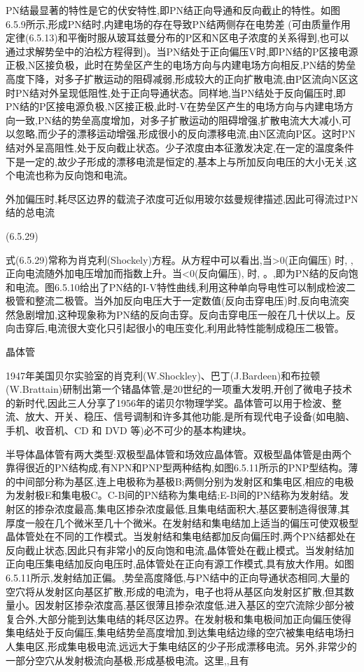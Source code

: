 PN结最显著的特性是它的伏安特性,即PN结正向导通和反向截止的特性。如图6.5.9所示,形成PN结时,内建电场的存在导致PN结两侧存在电势差 (可由质量作用定律(6.5.13)和平衡时服从玻耳兹曼分布的P区和N区电子浓度的关系得到,也可以通过求解势垒中的泊松方程得到)。当PN结处于正向偏压V时,即PN结的P区接电源正极,N区接负极，此时在势垒区产生的电场方向与内建电场方向相反,PN结的势垒高度下降，对多子扩散运动的阻碍减弱,形成较大的正向扩散电流,由P区流向N区这时PN结对外呈现低阻性,处于正向导通状态。同样地,当PN结处于反向偏压时,即PN结的P区接电源负极,N区接正极,此时-V在势垒区产生的电场方向与内建电场方向一致,PN结的势垒高度增加，对多子扩散运动的阻碍增强,扩散电流大大减小,可以忽略,而少子的漂移运动增强,形成很小的反向漂移电流,由N区流向P区。这时PN结对外呈高阻性,处于反向截止状态。少子浓度由本征激发决定,在一定的温度条件下是一定的,故少子形成的漂移电流是恒定的,基本上与所加反向电压的大小无关,这个电流也称为反向饱和电流。

外加偏压时,耗尽区边界的载流子浓度可近似用玻尔兹曼规律描述,因此可得流过PN结的总电流

 	(6.5.29)

式(6.5.29)常称为肖克利(Shockely)方程。从方程中可以看出,当>0(正向偏压) 时, ,正向电流随外加电压增加而指数上升。当<0(反向偏压), 时, 。,即为PN结的反向饱和电流。图6.5.10给出了PN结的I-V特性曲线,利用这种单向导电性可以制成检波二极管和整流二极管。当外加反向电压大于一定数值(反向击穿电压)时,反向电流突然急剧增加,这种现象称为PN结的反向击穿。反向击穿电压一般在几十伏以上。反向击穿后,电流很大变化只引起很小的电压变化,利用此特性能制成稳压二极管。



晶体管

1947年美国贝尔实验室的肖克利(W.Shockley)、巴丁(J.Bardeen)和布拉顿(W.Brattain)研制出第一个锗晶体管,是20世纪的一项重大发明,开创了微电子技术的新时代,因此三人分享了1956年的诺贝尔物理学奖。晶体管可以用于检波、整流、放大、开关、稳压、信号调制和许多其他功能,是所有现代电子设备(如电脑、手机、收音机、CD 和 DVD 等)必不可少的基本构建块。

半导体晶体管有两大类型:双极型晶体管和场效应晶体管。双极型晶体管是由两个靠得很近的PN结构成,有NPN和PNP型两种结构,如图6.5.11所示的PNP型结构。薄的中间部分称为基区,连上电极称为基极B;两侧分别为发射区和集电区,相应的电极为发射极E和集电极C。C-B间的PN结称为集电结;E-B间的PN结称为发射结。发射区的掺杂浓度最高,集电区掺杂浓度最低,且集电结面积大,基区要制造得很薄,其厚度一般在几个微米至几十个微米。在发射结和集电结加上适当的偏压可使双极型晶体管处在不同的工作模式。当发射结和集电结都加反向偏压时,两个PN结都处在反向截止状态,因此只有非常小的反向饱和电流,晶体管处在截止模式。当发射结加正向电压集电结加反向电压时,品体管处在正向有源工作模式,具有放大作用。如图6.5.11所示,发射结加正偏。,势垒高度降低,与PN结中的正向导通状态相同,大量的空穴将从发射区向基区扩散,形成的电流为，电子也将从基区向发射区扩散,但其数量小。因发射区掺杂浓度高,基区很薄且掺杂浓度低,进入基区的空穴流除少部分被复合外,大部分能到达集电结的耗尽区边界。在发射极和集电极间加正向偏压使得集电结处于反向偏压,集电结势垒高度增加,到达集电结边缘的空穴被集电结电场扫人集电区,形成集电极电流,远远大于集电结区的少子形成漂移电流。另外,非常少的一部分空穴从发射极流向基极,形成基极电流。这里,,且有

